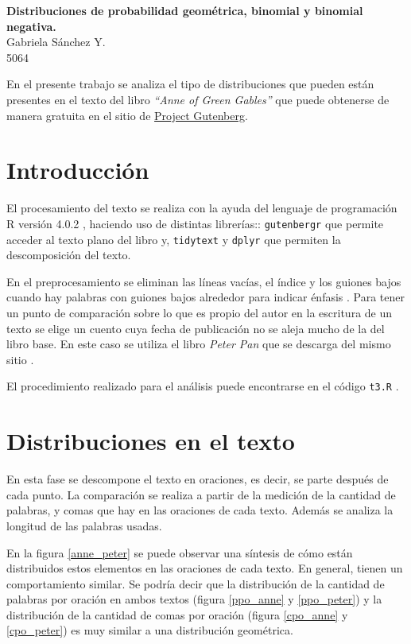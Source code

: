 \documentclass[12pt]{article}
\begin{document}
	\thispagestyle{empty}

	\begin{center}
		{\Large \bf Distribuciones de probabilidad geométrica, binomial y binomial negativa.}\\
		Gabriela S\'anchez Y.\\
		5064
	\end{center}
 
	En el presente trabajo se analiza el tipo de distribuciones que pueden están presentes en el texto del libro \textit{``Anne of Green Gables''} \cite{anne} que puede obtenerse de manera gratuita en el sitio de \href{http://www.gutenberg.org/}{Project Gutenberg}.

	\section{Introducción}
	
	El procesamiento del texto se realiza con la ayuda del lenguaje de programación \textsc{R} versión 4.0.2 \cite{r}, haciendo uso de distintas librerías:: \texttt{gutenbergr} que permite acceder al texto plano del libro y, \texttt{tidytext} y \texttt{dplyr} que permiten la descomposición del texto. 
	
	En el preprocesamiento se eliminan las líneas vacías, el índice y los guiones bajos cuando hay palabras con guiones bajos alrededor para indicar énfasis \cite{mpa_alberto}. Para tener un punto de comparación sobre lo que es propio del autor en la escritura de un texto se elige un cuento cuya fecha de publicación no se aleja mucho de la del libro base. En este caso se utiliza el libro \textit{Peter Pan} \cite{peterpan} que se descarga del mismo sitio \cite{pg}.
	
	El procedimiento realizado para el análisis puede encontrarse en el código \texttt{t3.R} \cite{mpa_gaby}.

	\section{Distribuciones en el texto}
	
	En esta fase se descompone el texto en oraciones, es decir, se parte después de cada punto. La comparación se realiza a partir de la medición de la cantidad de palabras, y comas que hay en las oraciones de cada texto. Además se analiza la longitud de las palabras usadas.
	
	En la figura \ref{anne_peter} se puede observar una síntesis de cómo están distribuidos estos elementos en las oraciones de cada texto. En general, tienen un comportamiento similar. Se podría decir que la distribución de la cantidad de palabras por oración en ambos textos (figura \ref{ppo_anne} y \ref{ppo_peter}) y la distribución de la cantidad de comas por oración (figura \ref{cpo_anne} y \ref{cpo_peter}) es muy similar a una distribución geométrica. 
	
\end{document}
